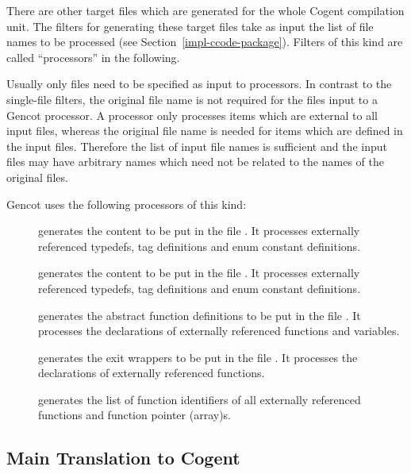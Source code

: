 There are other target files which are generated for the whole Cogent compilation unit. The filters for generating these target files 
take as input the list of file names to be processed (see Section~\ref{impl-ccode-package}). Filters of this kind 
are called ``processors'' in the following.

Usually only  files need to be specified as input to processors.
In contrast to the single-file filters, the original file name is not required for the files input to a 
Gencot processor. A processor only processes items which are external to all input files, whereas the original
file name is needed for items which are defined in the input files. Therefore the list of input file names is
sufficient and the input files may have arbitrary names which need not be related to the names of the original 
 files.

Gencot uses the following processors of this kind:
\begin{description}
\item[] generates the content to be put in the file . It 
processes externally referenced typedefs, tag definitions and enum constant definitions.
\item[] generates the content to be put in the file . It 
processes externally referenced typedefs, tag definitions and enum constant definitions.
\item[] generates the abstract function definitions to be put in the file 
. It processes the declarations of externally referenced functions and variables.
\item[] generates the exit wrappers to be put in the file . It processes
the declarations of externally referenced functions.
\item[] generates the list of function identifiers of all externally referenced functions and
function pointer (array)s.
\end{description}

\subsection{Main Translation to Cogent}
\label{impl-ccomps-main}

